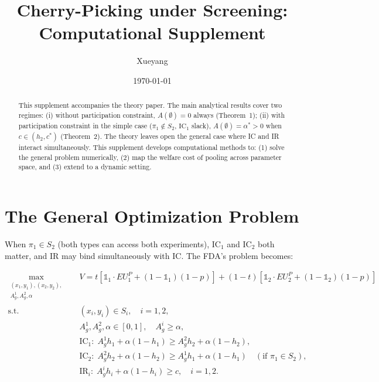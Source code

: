 \documentclass[12pt,a4paper]{article}
\title{Cherry-Picking under Screening:\\
  Computational Supplement}
\author{Xueyang}
\date{\today}
\begin{document}
\maketitle

\begin{abstract}
This supplement accompanies the theory paper.
The main analytical results cover two regimes:
(i) without participation constraint,
$A(\emptyset) = 0$ always (Theorem~1);
(ii) with participation constraint in the simple case
($\pi_1 \notin S_2$, $\mathrm{IC}_1$ slack),
$A(\emptyset) = \alpha^* > 0$ when
$c \in (h_2, c^*)$ (Theorem~2).
The theory leaves open the general case where IC and IR
interact simultaneously. This supplement develops
computational methods to: (1) solve the general problem
numerically, (2) map the welfare cost of pooling across
parameter space, and (3) extend to a dynamic setting.
\end{abstract}


\section{The General Optimization Problem}
\label{sec:general}

When $\pi_1 \in S_2$ (both types can access both
experiments), IC$_1$ and IC$_2$ both matter, and IR may
bind simultaneously with IC. The FDA's problem becomes:

\begin{align}
  \max_{\substack{(x_1,y_1),(x_2,y_2),\\
    A_g^1, A_g^2, \alpha}}
  \quad & V = t \left[\mathbb{1}_1 \cdot EU_1^P
    + (1-\mathbb{1}_1)(1-p)\right]
    + (1-t)\left[\mathbb{1}_2 \cdot EU_2^P
    + (1-\mathbb{1}_2)(1-p)\right]
  \nonumber \\
  \text{s.t.} \quad
  & (x_i, y_i) \in S_i, \quad i = 1,2,
  \nonumber \\
  & A_g^1, A_g^2, \alpha \in [0, 1], \quad
    A_g^i \geq \alpha,
  \nonumber \\
  & \text{IC}_1: \; A_g^1 h_1 + \alpha(1-h_1)
    \geq A_g^2 h_2 + \alpha(1-h_2),
  \label{eq:full_problem} \\
  & \text{IC}_2: \; A_g^2 h_2 + \alpha(1-h_2)
    \geq A_g^1 h_1 + \alpha(1-h_1)
    \quad (\text{if } \pi_1 \in S_2),
  \nonumber \\
  & \text{IR}_i: \; A_g^i h_i + \alpha(1-h_i)
    \geq c, \quad i = 1,2.
  \nonumber
\end{align}
\end{document}
